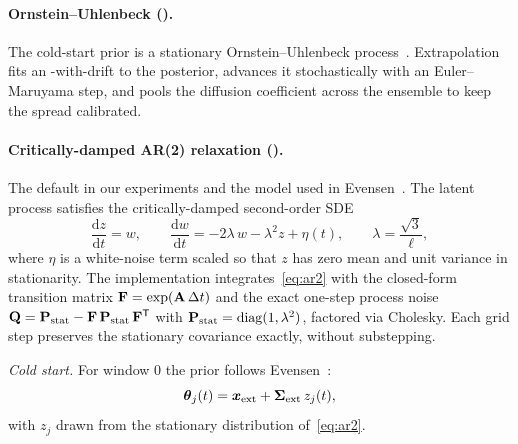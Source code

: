 \paragraph{Ornstein--Uhlenbeck ().}
The cold-start prior is a stationary Ornstein--Uhlenbeck
process~\cite{uhlenbeck1930ou}.  Extrapolation fits an
\OU{}-with-drift to the posterior, advances it stochastically with
an Euler--Maruyama step, and pools the diffusion coefficient across
the ensemble to keep the spread calibrated.

\paragraph{Critically-damped AR(2) relaxation ().}
The default in our experiments and the model used in
Evensen~\cite{evensen2024}.  The latent process satisfies the
critically-damped second-order SDE
\begin{equation}
  \frac{\mathrm{d} z}{\mathrm{d} t} = w,
  \qquad
  \frac{\mathrm{d} w}{\mathrm{d} t} = -2\lambda\, w - \lambda^2 z + \eta(t),
  \qquad
  \lambda = \frac{\sqrt{3}}{\ell},
  \label{eq:ar2}
\end{equation}
where $\eta$ is a white-noise term scaled so that $z$ has zero mean
and unit variance in stationarity.  The implementation
integrates~\eqref{eq:ar2} with the closed-form transition matrix
$\mathbf{F} = \exp(\mathbf{A}\,\Delta t)$ and the exact one-step process
noise $\mathbf{Q} = \mathbf{P}_{\mathrm{stat}} - \mathbf{F}\,
\mathbf{P}_{\mathrm{stat}}\, \mathbf{F}^{\mathsf{T}}$ with $\mathbf{P}_{\mathrm{stat}}
= \operatorname{diag}(1, \lambda^2)$, factored via Cholesky.  Each grid step
preserves the stationary covariance exactly, without substepping.

\medskip
\noindent\emph{Cold start.}\;
For window $0$ the prior follows
Evensen~\cite{evensen2024}:
\begin{equation}
  \boldsymbol{\theta}_j(t) = \boldsymbol{x}_{\mathrm{ext}} + \boldsymbol{\Sigma}_{\mathrm{ext}}\, z_j(t),
  \label{eq:ar2-cold}
\end{equation}
with $z_j$ drawn from the stationary distribution of~\eqref{eq:ar2}.

